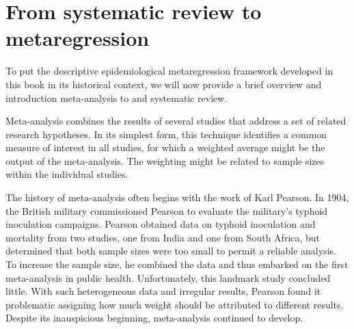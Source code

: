 \section{From systematic review to metaregression}
To put the descriptive epidemiological metaregression framework
developed in this book in its historical context, we will now
provide a brief overview and introduction meta-analysis to and
systematic review.

Meta-analysis combines the results of several studies that address a
set of related research hypotheses. In its simplest form, this
technique identifies a common measure of interest in all studies, for
which a weighted average might be the output of the meta-analysis.
The weighting might be related to sample sizes within the individual
studies.

The history of meta-analysis often begins with the work of Karl
Pearson.  In 1904, the British military commissioned Pearson to
evaluate the military's typhoid inoculation
campaigns.\cite{Pearson_Report_1904} Pearson obtained data on typhoid
inoculation and mortality from two studies, one from India and one
from South Africa, but determined that both
sample sizes were too small to permit a reliable analysis. To increase the sample
size, he combined the data and thus embarked on the first
meta-analysis in public health. Unfortunately, this landmark study concluded little.
With such heterogeneous data and irregular results, Pearson found
it problematic assigning how much weight should be attributed to
different results.  Despite its inauspicious beginning, meta-analysis
continued to develop.


